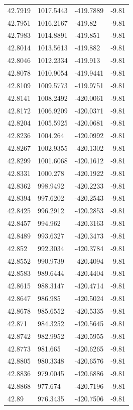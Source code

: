 \begin{table}[H]
\begin{tabular}{llll}
42.7919 & 1017.5443 & -419.7889 & -9.81 \\
42.7951 & 1016.2167 & -419.82 & -9.81 \\
42.7983 & 1014.8891 & -419.851 & -9.81 \\
42.8014 & 1013.5613 & -419.882 & -9.81 \\
42.8046 & 1012.2334 & -419.913 & -9.81 \\
42.8078 & 1010.9054 & -419.9441 & -9.81 \\
42.8109 & 1009.5773 & -419.9751 & -9.81 \\
42.8141 & 1008.2492 & -420.0061 & -9.81 \\
42.8172 & 1006.9209 & -420.0371 & -9.81 \\
42.8204 & 1005.5925 & -420.0681 & -9.81 \\
42.8236 & 1004.264 & -420.0992 & -9.81 \\
42.8267 & 1002.9355 & -420.1302 & -9.81 \\
42.8299 & 1001.6068 & -420.1612 & -9.81 \\
42.8331 & 1000.278 & -420.1922 & -9.81 \\
42.8362 & 998.9492 & -420.2233 & -9.81 \\
42.8394 & 997.6202 & -420.2543 & -9.81 \\
42.8425 & 996.2912 & -420.2853 & -9.81 \\
42.8457 & 994.962 & -420.3163 & -9.81 \\
42.8489 & 993.6327 & -420.3473 & -9.81 \\
42.852 & 992.3034 & -420.3784 & -9.81 \\
42.8552 & 990.9739 & -420.4094 & -9.81 \\
42.8583 & 989.6444 & -420.4404 & -9.81 \\
42.8615 & 988.3147 & -420.4714 & -9.81 \\
42.8647 & 986.985 & -420.5024 & -9.81 \\
42.8678 & 985.6552 & -420.5335 & -9.81 \\
42.871 & 984.3252 & -420.5645 & -9.81 \\
42.8742 & 982.9952 & -420.5955 & -9.81 \\
42.8773 & 981.665 & -420.6265 & -9.81 \\
42.8805 & 980.3348 & -420.6576 & -9.81 \\
42.8836 & 979.0045 & -420.6886 & -9.81 \\
42.8868 & 977.674 & -420.7196 & -9.81 \\
42.89 & 976.3435 & -420.7506 & -9.81 \\

\end{tabular}
\end{table}
